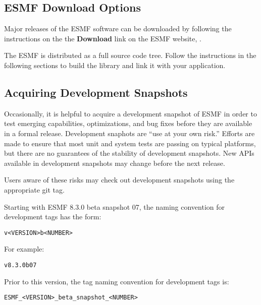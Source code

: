 
\subsection{ESMF Download Options}

Major releases of the ESMF software can be downloaded by following
the instructions on the the {\bf Download} link on the ESMF
website, .

The ESMF is distributed as a full source code tree.
Follow the instructions in the following sections
to build the library and link it with your application.

\subsection{Acquiring Development Snapshots}
Occasionally, it is helpful to acquire a development snapshot of ESMF
in order to test emerging capabilities, optimizations, and bug fixes
before they are available in a formal release.  Development snaphots
are ``use at your own risk.'' Efforts are made to ensure that most unit
and system tests are passing on typical platforms, but there are no
guarantees of the stability of development snapshots. New APIs available
in development snapshots may change before the next release.

Users aware of these risks may check out development snapshots
using the appropriate git tag.

Starting with ESMF 8.3.0 beta snapshot 07, the naming convention for development tags has the form:

\begin{verbatim}
v<VERSION>b<NUMBER>
\end{verbatim}

For example:
\begin{verbatim}
v8.3.0b07
\end{verbatim}

Prior to this version, the tag naming convention for development tags is:

\begin{verbatim}
ESMF_<VERSION>_beta_snapshot_<NUMBER>
\end{verbatim}

